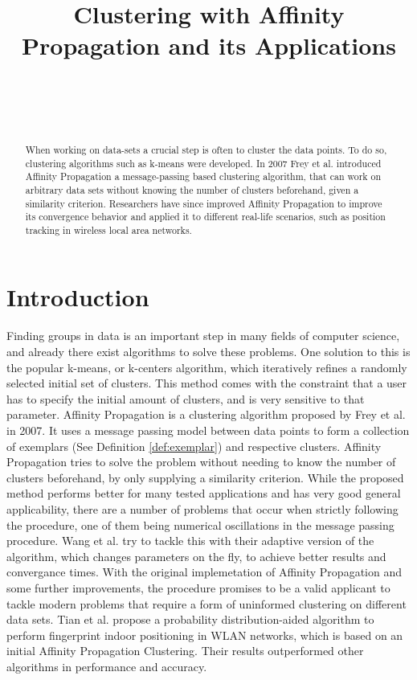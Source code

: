 \documentclass[11pt,a4paper]{article}
\title{Clustering with Affinity Propagation and its Applications}
\author{
 \authorname{Philipp-Alexander Auer} \\
 \studentnumber{01420446} \\
 \curriculum{033 535} \\
 \email{e1420446@student.tuwien.ac.at}
}
\begin{document}
\maketitle

\begin{abstract}
When working on data-sets a crucial step is often to cluster the data points. To do so, clustering algorithms such as k-means were developed. In 2007 Frey et al. introduced Affinity Propagation \cite{frey2007clustering} a message-passing based clustering algorithm, that can work on arbitrary data sets without knowing the number of clusters beforehand, given a similarity criterion. Researchers have since improved Affinity Propagation to improve its convergence behavior \cite{wang2008adaptive} and applied it to different real-life scenarios, such as position tracking in wireless local area networks. \cite{tian2013fingerprint}
\end{abstract}

\section{Introduction}

Finding groups in data is an important step in many fields of computer science, and already there exist algorithms to solve these problems. One solution to this is the popular k-means, or k-centers algorithm, which iteratively refines a randomly selected initial set of clusters. This method comes with the constraint that a user has to specify the initial amount of clusters, and is very sensitive to that parameter. \cite{frey2007clustering} 
Affinity Propagation is a clustering algorithm proposed by Frey et al. in 2007. It uses a message passing model between data points to form a collection of exemplars (See Definition \ref{def:exemplar}) and respective clusters. \cite{frey2007clustering} Affinity Propagation tries to solve the problem without needing to know the number of clusters beforehand, by only supplying a similarity criterion.
While the proposed method performs better for many tested applications \cite{frey2007clustering} and has very good general applicability, there are a number of problems that occur when strictly following the procedure, one of them being numerical oscillations in the message passing procedure. Wang et al. try to tackle this with their adaptive version of the algorithm, which changes parameters on the fly, to achieve better results and convergance times. \cite{wang2008adaptive} With the original implemetation of Affinity Propagation and some further improvements, the procedure promises to be a valid applicant to tackle modern problems that require a form of uninformed clustering on different data sets. Tian et al. propose a probability distribution-aided algorithm to perform fingerprint indoor positioning in WLAN networks, which is based on an initial Affinity Propagation Clustering. Their results outperformed other algorithms in performance and accuracy. \cite{tian2013fingerprint}
\end{document}
